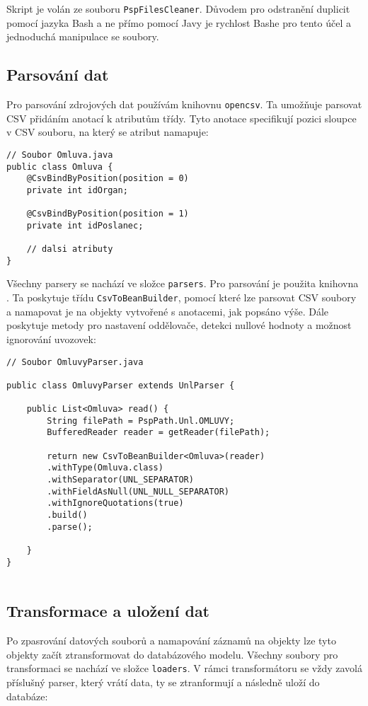 \noindent Skript je volán ze souboru \lstinline|PspFilesCleaner|. Důvodem pro odstranění duplicit pomocí jazyka Bash a ne přímo pomocí Javy je rychlost Bashe pro tento účel a jednoduchá manipulace se soubory.

\subsection{Parsování dat}
Pro parsování zdrojových dat používám knihovnu \lstinline|opencsv|. Ta umožňuje parsovat CSV přidáním anotací k atributům třídy. Tyto anotace specifikují pozici sloupce v CSV souboru, na který se atribut namapuje:

\begin{lstlisting}[caption={Parsování datového souboru omluvy.unl}, tabsize=2]
// Soubor Omluva.java
public class Omluva {
	@CsvBindByPosition(position = 0)
	private int idOrgan;
	
	@CsvBindByPosition(position = 1)
	private int idPoslanec;

	// dalsi atributy	
}
\end{lstlisting}

\noindent Všechny parsery se nachází ve složce \lstinline|parsers|. Pro parsování je použita knihovna \cite{opencsv}. Ta poskytuje třídu \lstinline|CsvToBeanBuilder|, pomocí které lze parsovat CSV soubory a namapovat je na objekty vytvořené s anotacemi, jak popsáno výše. Dále poskytuje metody pro nastavení oddělovače, detekci nullové hodnoty a možnost ignorování uvozovek:

\begin{lstlisting}[caption={Parsování datového souboru omluvy.unl}, tabsize=2]
// Soubor OmluvyParser.java
	
public class OmluvyParser extends UnlParser {
	
	public List<Omluva> read() {
		String filePath = PspPath.Unl.OMLUVY;
		BufferedReader reader = getReader(filePath);
		
		return new CsvToBeanBuilder<Omluva>(reader)
		.withType(Omluva.class)
		.withSeparator(UNL_SEPARATOR)
		.withFieldAsNull(UNL_NULL_SEPARATOR)
		.withIgnoreQuotations(true)
		.build()
		.parse();
		
	}
}
	
\end{lstlisting}

\subsection{Transformace a uložení dat}
Po zpasrování datových souborů a namapování záznamů na objekty lze tyto objekty začít ztransformovat do databázového modelu. Všechny soubory pro transformaci se nachází ve složce \lstinline|loaders|. V rámci transformátoru se vždy zavolá příslušný parser, který vrátí data, ty se ztranformují a následně uloží do databáze:

